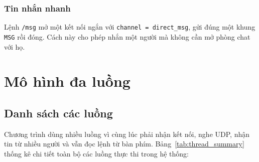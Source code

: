 \documentclass[a4paper,12pt]{article}
\newcommand{\code}[1]{\texttt{#1}}
\begin{document}
	\subsubsection{Tin nhắn nhanh}
	Lệnh \code{/msg} mở một kết nối ngắn với \code{channel = direct\_msg}, gửi đúng một khung \code{MSG} rồi đóng. Cách này cho phép nhắn một người mà không cần mở phòng chat với họ.
	
	\section{Mô hình đa luồng}
	\label{sec:thread_model}
	
	\subsection{Danh sách các luồng}
	Chương trình dùng nhiều luồng vì cùng lúc phải nhận kết nối, nghe UDP, nhận tin từ nhiều người và vẫn đọc lệnh từ bàn phím. Bảng~\ref{tab:thread_summary} thống kê chi tiết toàn bộ các luồng thực thi trong hệ thống:
	
\end{document}
